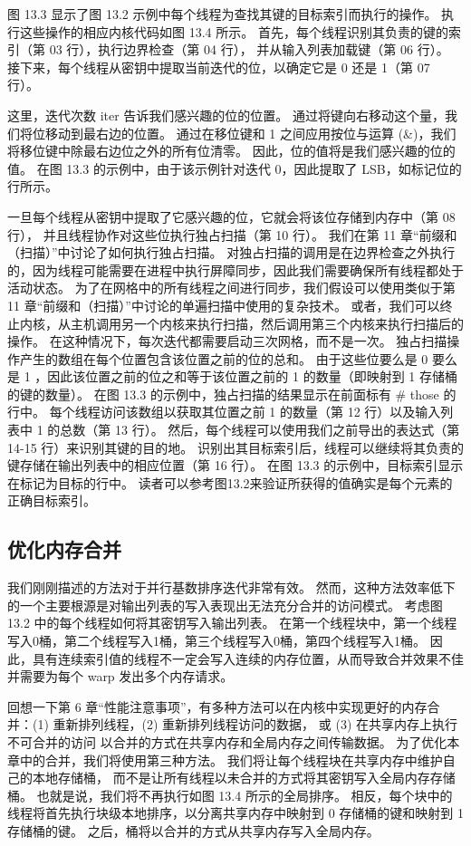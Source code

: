 图 13.3 显示了图 13.2 示例中每个线程为查找其键的目标索引而执行的操作。 
执行这些操作的相应内核代码如图 13.4 所示。 首先，每个线程识别其负责的键的索引（第 03 行），执行边界检查（第 04 行），
并从输入列表加载键（第 06 行）。 接下来，每个线程从密钥中提取当前迭代的位，以确定它是 0 还是 1（第 07 行）。

这里，迭代次数 iter 告诉我们感兴趣的位的位置。 通过将键向右移动这个量，我们将位移动到最右边的位置。 
通过在移位键和 1 之间应用按位与运算 (\&)，我们将移位键中除最右边位之外的所有位清零。 
因此，位的值将是我们感兴趣的位的值。 在图 13.3 的示例中，由于该示例针对迭代 0，因此提取了 LSB，如标记位的行所示。

一旦每个线程从密钥中提取了它感兴趣的位，它就会将该位存储到内存中（第 08 行），
并且线程协作对这些位执行独占扫描（第 10 行）。 我们在第 11 章“前缀和（扫描）”中讨论了如何执行独占扫描。 
对独占扫描的调用是在边界检查之外执行的，因为线程可能需要在进程中执行屏障同步，因此我们需要确保所有线程都处于活动状态。 
为了在网格中的所有线程之间进行同步，我们假设可以使用类似于第 11 章“前缀和（扫描）”中讨论的单遍扫描中使用的复杂技术。 
或者，我们可以终止内核，从主机调用另一个内核来执行扫描，然后调用第三个内核来执行扫描后的操作。 
在这种情况下，每次迭代都需要启动三次网格，而不是一次。 独占扫描操作产生的数组在每个位置包含该位置之前的位的总和。 
由于这些位要么是 0 要么是 1 ，因此该位置之前的位之和等于该位置之前的 1 的数量（即映射到 1 存储桶的键的数量）。 
在图 13.3 的示例中，独占扫描的结果显示在前面标有 \# those 的行中。 
每个线程访问该数组以获取其位置之前 1 的数量（第 12 行）以及输入列表中 1 的总数（第 13 行）。 
然后，每个线程可以使用我们之前导出的表达式（第 14-15 行）来识别其键的目的地。 
识别出其目标索引后，线程可以继续将其负责的键存储在输出列表中的相应位置（第 16 行）。 
在图 13.3 的示例中，目标索引显示在标记为目标的行中。 读者可以参考图13.2来验证所获得的值确实是每个元素的正确目标索引。

\subsection{优化内存合并}
我们刚刚描述的方法对于并行基数排序迭代非常有效。 
然而，这种方法效率低下的一个主要根源是对输出列表的写入表现出无法充分合并的访问模式。 
考虑图 13.2 中的每个线程如何将其密钥写入输出列表。 
在第一个线程块中，第一个线程写入0桶，第二个线程写入1桶，第三个线程写入0桶，第四个线程写入1桶。 
因此，具有连续索引值的线程不一定会写入连续的内存位置，从而导致合并效果不佳并需要为每个 warp 发出多个内存请求。

回想一下第 6 章“性能注意事项”，有多种方法可以在内核中实现更好的内存合并：(1) 重新排列线程，(2) 重新排列线程访问的数据，
或 (3) 在共享内存上执行不可合并的访问 以合并的方式在共享内存和全局内存之间传输数据。 
为了优化本章中的合并，我们将使用第三种方法。 我们将让每个线程块在共享内存中维护自己的本地存储桶，
而不是让所有线程以未合并的方式将其密钥写入全局内存存储桶。 也就是说，我们将不再执行如图 13.4 所示的全局排序。 
相反，每个块中的线程将首先执行块级本地排序，以分离共享内存中映射到 0 存储桶的键和映射到 1 存储桶的键。 
之后，桶将以合并的方式从共享内存写入全局内存。

